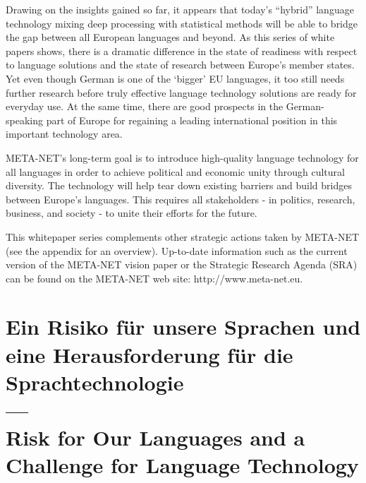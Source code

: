 \documentclass[]{../../metanetpaper}
\begin{document}
\begin{Parallel}[c]{80mm}{80mm}
{    

    Drawing on the insights gained so far, it appears that today’s ``hybrid'' language technology mixing deep processing with statistical methods will be able to bridge the gap between all European languages and beyond. As this series of white papers shows, there is a dramatic difference in the state of readiness with respect to language solutions and the state of research between Europe’s member states. Yet even though German is one of the ‘bigger’ EU languages, it too still needs further research before truly effective language technology solutions are ready for everyday use. At the same time, there are good prospects in the German-speaking part of Europe for regaining a leading international position in this important technology area. 

    META-NET’s long-term goal is to introduce high-quality language technology for all languages in order to achieve political and economic unity through cultural diversity. The technology will help tear down existing barriers and build bridges between Europe’s languages. This requires all stakeholders - in politics, research, business, and society - to unite their efforts for the future.

    This whitepaper series complements other strategic actions taken by META-NET (see the appendix for an overview). Up-to-date information such as the current version of the META-NET vision paper\cite{Meta1} or the Strategic Research Agenda (SRA) can be found on the META-NET web site: http://www.meta-net.eu.
  }
  
  \ParallelPar
  
  \clearpage
  
  
  \section[Ein Risiko für unsere Sprachen und eine Herausforderung für die Sprachtechnologie --- Risk for Our Languages and a Challenge for Language Technology]{Ein Risiko für unsere Sprachen und eine Herausforderung für die Sprachtechnologie\\ ---\\ Risk for Our Languages and a Challenge for Language Technology}
  

\end{Parallel}
\end{document}

